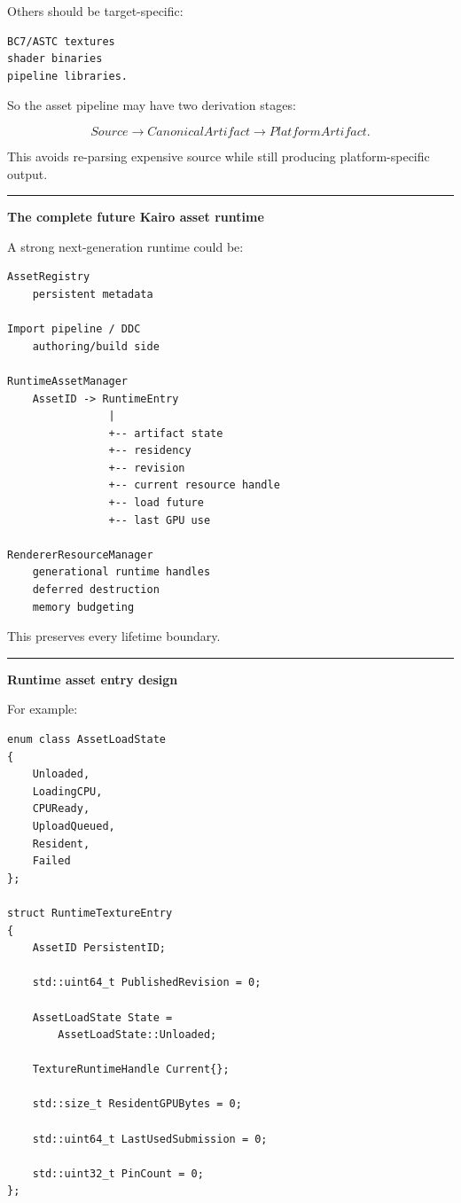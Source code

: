 Others should be target-specific:

\begin{verbatim}
BC7/ASTC textures
shader binaries
pipeline libraries.
\end{verbatim}

So the asset pipeline may have two derivation stages:

\[
Source
\rightarrow
CanonicalArtifact
\rightarrow
PlatformArtifact.
\]

This avoids re-parsing expensive source while still producing platform-specific output.

\begin{center}\rule{0.5\linewidth}{0.5pt}\end{center}

\textbf{The complete future Kairo asset runtime}

A strong next-generation runtime could be:

\begin{verbatim}
AssetRegistry
    persistent metadata

Import pipeline / DDC
    authoring/build side

RuntimeAssetManager
    AssetID -> RuntimeEntry
                |
                +-- artifact state
                +-- residency
                +-- revision
                +-- current resource handle
                +-- load future
                +-- last GPU use

RendererResourceManager
    generational runtime handles
    deferred destruction
    memory budgeting
\end{verbatim}

This preserves every lifetime boundary.

\begin{center}\rule{0.5\linewidth}{0.5pt}\end{center}

\textbf{Runtime asset entry design}

For example:

\begin{verbatim}
enum class AssetLoadState
{
    Unloaded,
    LoadingCPU,
    CPUReady,
    UploadQueued,
    Resident,
    Failed
};

struct RuntimeTextureEntry
{
    AssetID PersistentID;

    std::uint64_t PublishedRevision = 0;

    AssetLoadState State =
        AssetLoadState::Unloaded;

    TextureRuntimeHandle Current{};

    std::size_t ResidentGPUBytes = 0;

    std::uint64_t LastUsedSubmission = 0;

    std::uint32_t PinCount = 0;
};
\end{verbatim}

